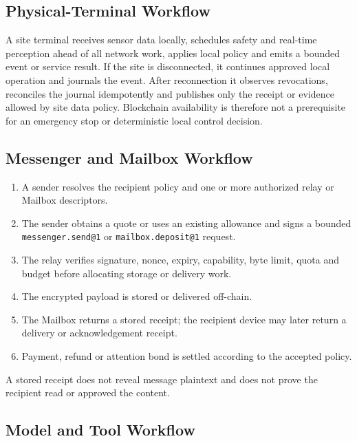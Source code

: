 \documentclass[11pt,oneside]{article}
\newcommand{\opid}[1]{\texttt{#1}}
\begin{document}
\subsection{Physical-Terminal Workflow}

A site terminal receives sensor data locally, schedules safety and real-time perception ahead
of all network work, applies local policy and emits a bounded event or service result. If the
site is disconnected, it continues approved local operation and journals the event. After
reconnection it observes revocations, reconciles the journal idempotently and publishes only
the receipt or evidence allowed by site data policy. Blockchain availability is therefore
not a prerequisite for an emergency stop or deterministic local control decision.


\subsection{Messenger and Mailbox Workflow}

\begin{enumerate}
  \item A sender resolves the recipient policy and one or more authorized relay or Mailbox
        descriptors.
  \item The sender obtains a quote or uses an existing allowance and signs a bounded
        \opid{messenger.send@1} or \opid{mailbox.deposit@1} request.
  \item The relay verifies signature, nonce, expiry, capability, byte limit, quota and budget
        before allocating storage or delivery work.
  \item The encrypted payload is stored or delivered off-chain.
  \item The Mailbox returns a stored receipt; the recipient device may later return a delivery
        or acknowledgement receipt.
  \item Payment, refund or attention bond is settled according to the accepted policy.
\end{enumerate}

A stored receipt does not reveal message plaintext and does not prove the recipient read or
approved the content.

\subsection{Model and Tool Workflow}
\end{document}
